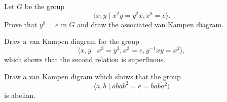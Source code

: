 \begin{questions}

\question Let $G$ be the group
  \[ \langle x,y \mid x^2y=y^2x, x^8=e \rangle. \]
  Prove that $y^8=e$ in $G$ and draw the associated van Kampen diagram.

\question Draw a van Kampen diagram for the group
  \[ \langle x,y \mid x^3=y^2, x^3=e, y^{-1}xy=x^2 \rangle, \]
  which shows that the second relation is superfluous.

\question Draw a van Kampen digram which shows that the group
  \[ \langle a,b \mid abab^2 = e = baba^2 \rangle \]
  is abelian.
\end{questions}

